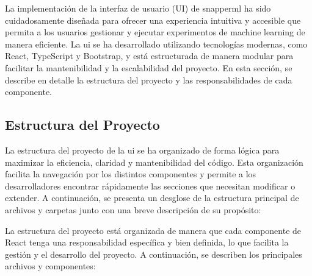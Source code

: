La implementación de la interfaz de usuario (UI) de \Gls{snapperml} ha sido cuidadosamente diseñada para ofrecer una experiencia intuitiva y accesible que permita a los usuarios gestionar y ejecutar experimentos de machine learning de manera eficiente. La \acrshort{ui} se ha desarrollado utilizando tecnologías modernas, como React, TypeScript y Bootstrap, y está estructurada de manera modular para facilitar la mantenibilidad y la escalabilidad del proyecto. En esta sección, se describe en detalle la estructura del proyecto y las responsabilidades de cada componente.

\subsection{Estructura del Proyecto}
La estructura del proyecto de la \acrshort{ui} se ha organizado de forma lógica para maximizar la eficiencia, claridad y mantenibilidad del código. Esta organización facilita la navegación por los distintos componentes y permite a los desarrolladores encontrar rápidamente las secciones que necesitan modificar o extender. A continuación, se presenta un desglose de la estructura principal de archivos y carpetas junto con una breve descripción de su propósito:



La estructura del proyecto está organizada de manera que cada componente de React tenga una responsabilidad específica y bien definida, lo que facilita la gestión y el desarrollo del proyecto. A continuación, se describen los principales archivos y componentes:

